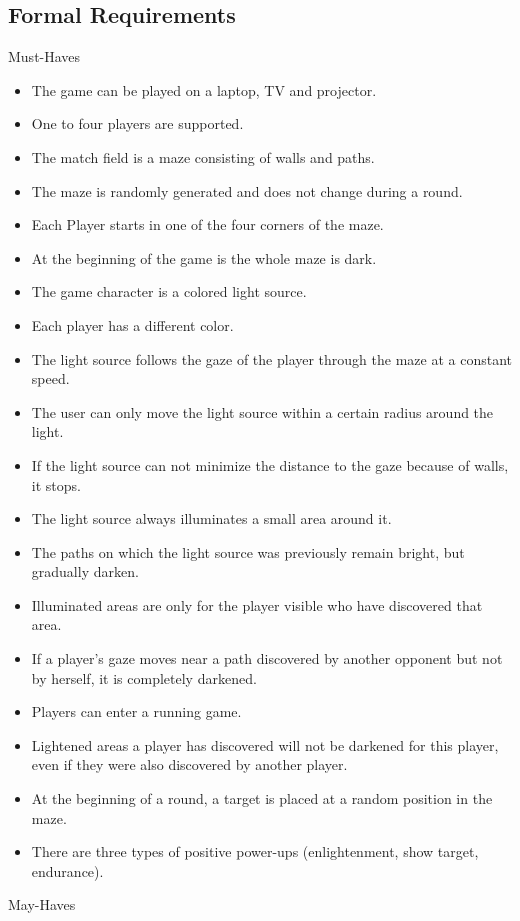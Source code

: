 \documentclass{sigchi}
\begin{document}
\subsection{Formal Requirements}
	Must-Haves
	\begin{itemize}
		\item The game can be played on a laptop, TV and projector.
		\item One to four players are supported. 
		\item The match field is a maze consisting of walls and paths.
		\item The maze is randomly generated and does not change during a round.
		\item Each Player starts in one of the four corners of the maze.
		\item At the beginning of the game is the whole maze is dark.
		\item The game character is a colored light source.
		\item Each player has a different color.
		\item The light source follows the gaze of the player through the maze at a constant speed.
		\item The user can only move the light source within a certain radius around the light.
		\item If the light source can not minimize the distance to the gaze because of walls, it stops.
		\item The light source always illuminates a small area around it.
		\item The paths on which the light source was previously remain bright, but gradually darken.
		\item Illuminated areas are only for the player visible who have discovered that area.
		\item If a player's gaze moves near a path discovered by another opponent but not by herself, it is completely darkened. 
		\item Players can enter a running game.
		\item Lightened areas a player has discovered will not be darkened for this player, even if they were also discovered by another player.
		\item At the beginning of a round, a target is placed at a random position in the maze.
		\item There are three types of positive power-ups (enlightenment, show target, endurance).
	\end{itemize}
	May-Haves
\end{document}
